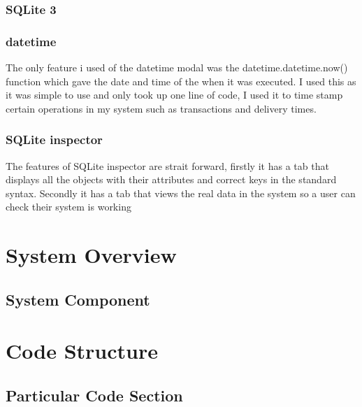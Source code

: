 \subsubsection{SQLite 3}


\subsubsection{datetime}
The only feature i used of the datetime modal was the datetime.datetime.now() function which gave the date and time of the when it was executed. I used this as it was simple to use and only took up one line of code, I used it to time stamp certain operations in my system such as transactions and delivery times.

\subsubsection{SQLite inspector}
The features of SQLite inspector are strait forward, firstly it has a tab that displays all the objects with their attributes and correct keys in the standard syntax. Secondly it has a tab that views the real data in the system so a user can check their system is working


\section{System Overview}

\subsection{System Component}

\section{Code Structure}

\subsection{Particular Code Section}
\begin{comment}
\begin{figure}[H]
    \pythonfile[firstline=5,lastline=10]{./tex/function_programs/print_function.py}
    \caption{The print() function} \label{fig:print_function}
\end{figure}
\end{comment}

